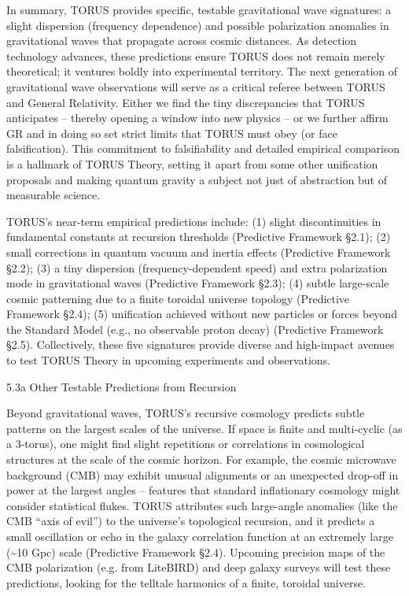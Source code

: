 \documentclass[]{article}
\begin{document}
In summary, TORUS provides specific, testable gravitational wave
signatures: a slight dispersion (frequency dependence) and possible
polarization anomalies in gravitational waves that propagate across
cosmic distances. As detection technology advances, these predictions
ensure TORUS does not remain merely theoretical; it ventures boldly into
experimental territory. The next generation of gravitational wave
observations will serve as a critical referee between TORUS and General
Relativity. Either we find the tiny discrepancies that TORUS anticipates
-- thereby opening a window into new physics -- or we further affirm GR
and in doing so set strict limits that TORUS must obey (or face
falsification). This commitment to falsifiability and detailed empirical
comparison is a hallmark of TORUS Theory, setting it apart from some
other unification proposals and making quantum gravity a subject not
just of abstraction but of measurable science.

TORUS's near-term empirical predictions include: (1) slight
discontinuities in fundamental constants at recursion thresholds
(Predictive Framework §2.1); (2) small corrections in quantum vacuum and
inertia effects (Predictive Framework §2.2); (3) a tiny dispersion
(frequency-dependent speed) and extra polarization mode in gravitational
waves (Predictive Framework §2.3); (4) subtle large-scale cosmic
patterning due to a finite toroidal universe topology (Predictive
Framework §2.4); (5) unification achieved without new particles or
forces beyond the Standard Model (e.g., no observable proton decay)
(Predictive Framework §2.5). Collectively, these five signatures provide
diverse and high-impact avenues to test TORUS Theory in upcoming
experiments and observations.

5.3a Other Testable Predictions from Recursion

Beyond gravitational waves, TORUS's recursive cosmology predicts subtle
patterns on the largest scales of the universe. If space is finite and
multi-cyclic (as a 3-torus), one might find slight repetitions or
correlations in cosmological structures at the scale of the cosmic
horizon. For example, the cosmic microwave background (CMB) may exhibit
unusual alignments or an unexpected drop-off in power at the largest
angles -- features that standard inflationary cosmology might consider
statistical flukes. TORUS attributes such large-angle anomalies (like
the CMB ``axis of evil'') to the universe's topological recursion, and
it predicts a small oscillation or echo in the galaxy correlation
function at an extremely large (\textasciitilde{}10 Gpc) scale
(Predictive Framework §2.4). Upcoming precision maps of the CMB
polarization (e.g. from LiteBIRD) and deep galaxy surveys will test
these predictions, looking for the telltale harmonics of a finite,
toroidal universe.
\end{document}
